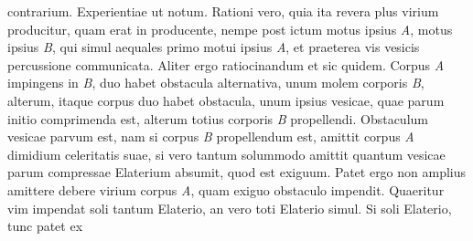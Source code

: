 contrarium. Experientiae%
\protect{}
ut notum. Rationi%
\protect{} vero, quia ita revera plus virium%
\protect{} producitur, quam erat in producente, nempe
post ictum%
\protect{} motus ipsius \textit{A}, motus ipsius \textit{B}, qui simul aequales primo motui ipsius \textit{A}, et praeterea vis vesicis%
\protect{} 
percussione%
\protect{} communicata. Aliter ergo ratiocinandum et sic quidem. 
\pend
\pstart
Corpus \textit{A} impingens in \textit{B},
duo habet %
obstacula\protect{} alternativa, unum molem%
\protect{} corporis \textit{B}, alterum, 
  {}
itaque
corpus duo habet %
obstacula,\protect{} unum ipsius 
vesicae, quae parum initio comprimenda est, alterum totius corporis
\textit{B} propellendi. Obstaculum vesicae parvum est,  
   {\lemma{}} nam si corpus 
\textit{B} propellendum est, amittit corpus 
\textit{A} dimidium celeritatis%
\protect{} suae, si vero 
{\lemma{}} 
 tantum solummodo amittit quantum vesicae%
\protect{} parum compressae
Elaterium%
\protect{} absumit, quod est exiguum. Patet ergo non amplius amittere debere virium%
\protect{} corpus \textit{A}, quam exiguo %
obstaculo\protect{}
impendit. Quaeritur  
  {}
vim%
\protect{} impendat soli tantum Elaterio,%
\protect{} an vero toti 
  {}
Elaterio%
\protect{} simul. Si soli Elaterio,%
\protect{} tunc patet ex 
    {\lemma{}}
